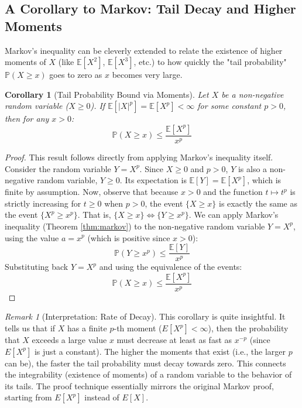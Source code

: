 \documentclass[11pt, letterpaper]{article}
\theoremstyle{plain} %
\newtheorem{corollary}[theorem]{Corollary}
\theoremstyle{definition} %
\theoremstyle{remark} %
\newtheorem{remark}[theorem]{Remark}
\newcommand{\E}{\mathbb{E}} %
\newcommand{\Prob}{\mathbb{P}} %
\begin{document}
\subsection{A Corollary to Markov: Tail Decay and Higher Moments}

Markov's inequality can be cleverly extended to relate the existence of higher moments of $X$ (like $\E[X^2]$, $\E[X^3]$, etc.) to how quickly the "tail probability" $\Prob(X \ge x)$ goes to zero as $x$ becomes very large.

\begin{corollary}[Tail Probability Bound via Moments] \label{cor:markov_moments}
Let $X$ be a non-negative random variable ($X \ge 0$). If $\E[|X|^p] = \E[X^p] < \infty$ for some constant $p > 0$, then for any $x > 0$:
\[
\Prob(X \ge x) \le \frac{\E[X^p]}{x^p}
\]
\end{corollary}

\begin{proof}
This result follows directly from applying Markov's inequality itself.
Consider the random variable $Y = X^p$. Since $X \ge 0$ and $p > 0$, $Y$ is also a non-negative random variable, $Y \ge 0$. Its expectation is $\E[Y] = \E[X^p]$, which is finite by assumption.
Now, observe that because $x > 0$ and the function $t \mapsto t^p$ is strictly increasing for $t \ge 0$ when $p > 0$, the event $\{X \ge x\}$ is exactly the same as the event $\{X^p \ge x^p\}$. That is, $\{X \ge x\} \iff \{Y \ge x^p\}$.
We can apply Markov's inequality (Theorem \ref{thm:markov}) to the non-negative random variable $Y = X^p$, using the value $a = x^p$ (which is positive since $x > 0$):
\[
\Prob(Y \ge x^p) \le \frac{\E[Y]}{x^p}
\]
Substituting back $Y = X^p$ and using the equivalence of the events:
\[
\Prob(X \ge x) \le \frac{\E[X^p]}{x^p}
\]
\end{proof}

\begin{remark}[Interpretation: Rate of Decay]
This corollary is quite insightful. It tells us that if $X$ has a finite $p$-th moment ($E[X^p] < \infty$), then the probability that $X$ exceeds a large value $x$ must decrease at least as fast as $x^{-p}$ (since $E[X^p]$ is just a constant). The higher the moments that exist (i.e., the larger $p$ can be), the faster the tail probability must decay towards zero. This connects the integrability (existence of moments) of a random variable to the behavior of its tails. The proof technique essentially mirrors the original Markov proof, starting from $E[X^p]$ instead of $E[X]$.
\end{remark}
\end{document}
